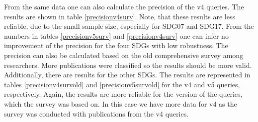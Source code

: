 \documentclass{article}
\begin{document}
From the same data one can also calculate the precision of the v4 queries. The results are shown in table \ref{precisionv4surv}. Note, that these results are less reliable, due to the small sample size, especially for SDG07 and SDG17. 
From the numbers in tables \ref{precisionv5surv} and \ref{precisionv4surv} one can infer no improvement of the precision for the four SDGs with low robustness.
The precision can also be calculated based on the old comprehensive survey among researchers. More publications were classified so the results should be more valid. Additionally, there are results for the other SDGs. The results are represented in tables  \ref{precisionv4survold} and \ref{precisionv5survold} for the v4 and v5 queries, respectively. Again, the results are more reliable for the version of the queries, which the survey was based on. In this case we have more data for v4 as the survey was conducted with publications from the v4 queries.
\end{document}
